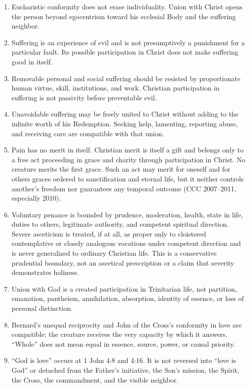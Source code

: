 \begin{enumerate}[leftmargin=1.45em,itemsep=0.25em]
\item Eucharistic conformity does not erase individuality. Union with Christ opens the person beyond egocentrism toward his ecclesial Body and the suffering neighbor.
\item Suffering is an experience of evil and is not presumptively a punishment for a particular fault. Its possible participation in Christ does not make suffering good in itself.
\item Removable personal and social suffering should be resisted by proportionate human virtue, skill, institutions, and work. Christian participation in suffering is not passivity before preventable evil.
\item Unavoidable suffering may be freely united to Christ without adding to the infinite worth of his Redemption. Seeking help, lamenting, reporting abuse, and receiving care are compatible with that union.
\item Pain has no merit in itself. Christian merit is itself a gift and belongs only to a free act proceeding in grace and charity through participation in Christ. No creature merits the first grace. Such an act may merit for oneself and for others graces ordered to sanctification and eternal life, but it neither controls another's freedom nor guarantees any temporal outcome (CCC 2007--2011, especially 2010).
\item Voluntary penance is bounded by prudence, moderation, health, state in life, duties to others, legitimate authority, and competent spiritual direction. Severe asceticism is treated, if at all, as proper only to cloistered contemplative or closely analogous vocations under competent direction and is never generalized to ordinary Christian life. This is a conservative prudential boundary, not an ascetical prescription or a claim that severity demonstrates holiness.
\item Union with God is a created participation in Trinitarian life, not partition, emanation, pantheism, annihilation, absorption, identity of essence, or loss of personal distinction.
\item Bernard's unequal reciprocity and John of the Cross's conformity in love are compatible: the creature receives the very capacity by which it answers. ``Whole'' does not mean equal in essence, source, power, or causal priority.
\item ``God is love'' occurs at 1 John 4:8 and 4:16. It is not reversed into ``love is God'' or detached from the Father's initiative, the Son's mission, the Spirit, the Cross, the commandment, and the visible neighbor.
\end{enumerate}

